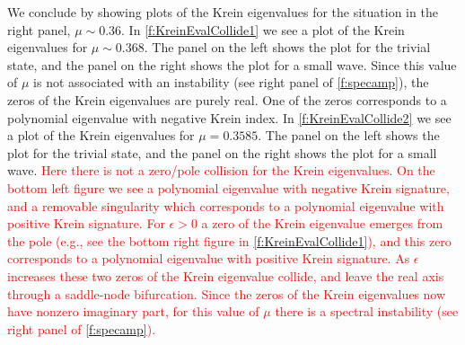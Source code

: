 \documentclass[review,onefignum,onetabnum]{siamart171218}
\newcommand{\revised}[1]{ \textcolor{red}{#1} }
\begin{document}
We conclude by showing plots of the Krein eigenvalues for the situation in the right panel, $\mu\sim0.36$. In \cref{f:KreinEvalCollide1} we see
a plot of the Krein eigenvalues for $\mu\sim0.368$. The panel on the left
shows the plot for the trivial state, and the panel on the right shows the
plot for a small wave. Since this value of $\mu$ is not associated with an
instability (see right panel of \cref{f:specamp}), the zeros of the Krein
eigenvalues are purely real. One of the zeros corresponds to a polynomial eigenvalue with negative Krein index. In
\cref{f:KreinEvalCollide2} we see a plot of the Krein eigenvalues for
$\mu=0.3585$. The panel on the left shows the plot for the trivial state, and
the panel on the right shows the plot for a small wave.
\revised{
Here there is not a
zero/pole collision for the Krein eigenvalues. On the bottom left figure we see a polynomial eigenvalue with negative Krein signature, and a removable singularity which corresponds to a polynomial eigenvalue with positive Krein signature. For $\epsilon>0$ a zero of the Krein eigenvalue emerges from the pole (e.g., see the bottom right figure in \cref{f:KreinEvalCollide1}), and this zero corresponds to a polynomial eigenvalue with positive Krein signature. As $\epsilon$ increases these two zeros of the Krein eigenvalue collide, and leave the real axis through a saddle-node bifurcation. Since the
zeros of the Krein eigenvalues now have nonzero imaginary part, for this value of $\mu$ there is a spectral instability (see right panel of \cref{f:specamp}).
}

\end{document}
